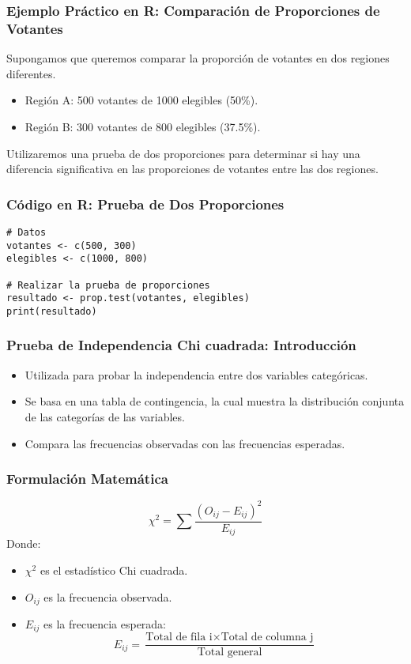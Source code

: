 \documentclass[aspectratio=169]{beamer}
\begin{document}
\begin{frame}
\frametitle{Ejemplo Práctico en R: Comparación de Proporciones de Votantes}

Supongamos que queremos comparar la proporción de votantes en dos regiones diferentes.

\begin{itemize}
    \item Región A: 500 votantes de 1000 elegibles (50\%).
    \item Región B: 300 votantes de 800 elegibles (37.5\%).
\end{itemize}

Utilizaremos una prueba de dos proporciones para determinar si hay una diferencia significativa en las proporciones de votantes entre las dos regiones.

\end{frame}

\begin{frame}[fragile]
\frametitle{Código en R: Prueba de Dos Proporciones}

\begin{verbatim}
# Datos
votantes <- c(500, 300)
elegibles <- c(1000, 800)

# Realizar la prueba de proporciones
resultado <- prop.test(votantes, elegibles)
print(resultado)
\end{verbatim}

\end{frame}




\begin{frame}
\frametitle{Prueba de Independencia Chi cuadrada: Introducción}
\begin{itemize}
    \item Utilizada para probar la independencia entre dos variables categóricas.
    \item Se basa en una tabla de contingencia, la cual muestra la distribución conjunta de las categorías de las variables.
    \item Compara las frecuencias observadas con las frecuencias esperadas.
\end{itemize}
\end{frame}

\begin{frame}
\frametitle{Formulación Matemática}
\[ \chi^2 = \sum \frac{(O_{ij} - E_{ij})^2}{E_{ij}} \]
Donde:
\begin{itemize}
    \item \( \chi^2 \) es el estadístico Chi cuadrada.
    \item \( O_{ij} \) es la frecuencia observada.
    \item \( E_{ij} \) es la frecuencia esperada: \[ E_{ij} = \frac{\text{Total de fila i} \times \text{Total de columna j}}{\text{Total general}} \]
\end{itemize}
\end{frame}
\end{document}
